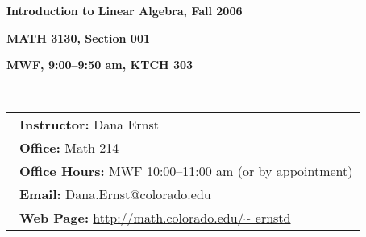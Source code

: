 \documentclass[12pt]{article}
\begin{document}
\centerline{\large\bf Introduction to Linear Algebra, Fall 2006} 
\centerline{\large\bf MATH 3130, Section 001} 

\smallskip

\centerline{\bf MWF, 9:00--9:50 am, KTCH 303}

\bigskip

\\

\begin{tabular}{l}
\, {\bf  Instructor:}  Dana Ernst\\
\, {\bf  Office:} Math 214\\
\, {\bf  Office Hours:} MWF 10:00--11:00 am (or by appointment)\\
\, {\bf  Email:} Dana.Ernst@colorado.edu\\
\, {\bf  Web Page:}  \url{http://math.colorado.edu/~ ernstd}\\
\end{tabular}\\

\smallskip

\end{document}
